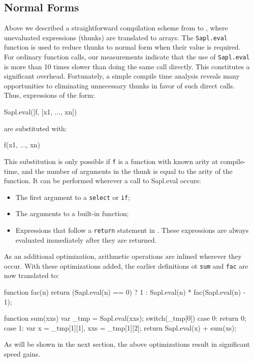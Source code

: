 \subsection{Normal Forms}
Above we described a straightforward compilation scheme from \Sapl to \JS, 
where unevaluated expressions (thunks) are translated to arrays. The
\texttt{Sapl.eval} function is used to reduce thunks to normal form when their
value is required. For ordinary function calls, our measurements indicate that 
the use of \texttt{Sapl.eval} is more than 10 times slower than doing the same
call directly. This constitutes a significant overhead. Fortunately, a simple
compile time analysis reveals many opportunities to eliminating unnecessary 
thunks in favor of such direct calls. Thus, expressions of the form:
\begin{CleanCode}
Sapl.eval([f, [x1, ..., xn])
\end{CleanCode}
are substituted with:
\begin{CleanCode}
f(x1, ..., xn)
\end{CleanCode}
This substitution is only possible if \texttt{f} is a function with known arity
at compile-time, and the number of arguments in the thunk is equal to the arity
of the function. It can be performed wherever a call to \textsf{Sapl.eval} 
occurs:
\begin{itemize}
\item The first argument to a \texttt{select} or \texttt{if};
\item The arguments to a built-in function;
\item Expressions that follow a \texttt{return} statement in \JS. These
      expressions are always evaluated immediately after they are returned.
\end{itemize}

As an additional optimization, arithmetic operations are inlined wherever they
occur. With these optimizations added, the earlier definitions ot \texttt{sum} 
and \texttt{fac} are now translated to:
\begin{CleanCode}
function fac(n){
	return (Sapl.eval(n) == 0) ? 1 : Sapl.eval(n) * fac(Sapl.eval(n) - 1);
}
\end{CleanCode}
\begin{CleanCode}
function sum(xxs) {
	var _tmp = Sapl.eval(xxs);
	switch(_tmp[0]){
		case 0: return 0;
		case 1: var x = _tmp[1][1], xxs = _tmp[1][2]; 
		        return Sapl.eval(x) + sum(xs);
	}
}
\end{CleanCode}
As will be shown in the next section, the above optimizations result in
significant speed gains.

